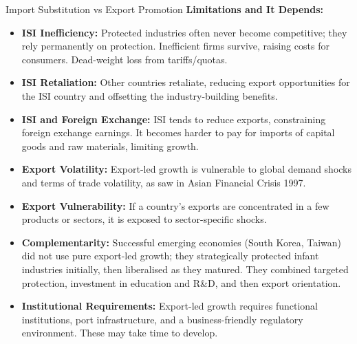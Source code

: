 \documentclass[11pt, a4paper, twoside]{book}
\begin{document}
\begin{evaluation}{Import Substitution vs Export Promotion}
\textbf{Limitations and It Depends:}
\begin{itemize}
  \item \textbf{ISI Inefficiency:} Protected industries often never become competitive; they rely permanently on protection. Inefficient firms survive, raising costs for consumers. Dead-weight loss from tariffs/quotas.
  \item \textbf{ISI Retaliation:} Other countries retaliate, reducing export opportunities for the ISI country and offsetting the industry-building benefits.
  \item \textbf{ISI and Foreign Exchange:} ISI tends to reduce exports, constraining foreign exchange earnings. It becomes harder to pay for imports of capital goods and raw materials, limiting growth.
  \item \textbf{Export Volatility:} Export-led growth is vulnerable to global demand shocks and terms of trade volatility, as saw in Asian Financial Crisis 1997.
  \item \textbf{Export Vulnerability:} If a country's exports are concentrated in a few products or sectors, it is exposed to sector-specific shocks.
  \item \textbf{Complementarity:} Successful emerging economies (South Korea, Taiwan) did not use pure export-led growth; they strategically protected infant industries initially, then liberalised as they matured. They combined targeted protection, investment in education and R\&D, and then export orientation.
  \item \textbf{Institutional Requirements:} Export-led growth requires functional institutions, port infrastructure, and a business-friendly regulatory environment. These may take time to develop.
\end{itemize}
\end{evaluation}
\end{document}
